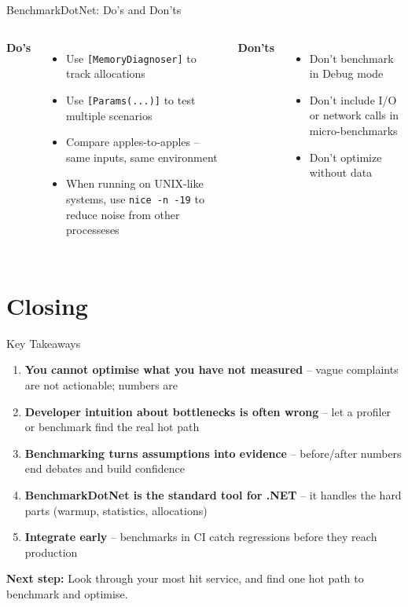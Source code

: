 \documentclass[aspectratio=1610, xcolor=table]{beamer}
\begin{document}
\begin{frame}{BenchmarkDotNet: Do's and Don'ts}
	\begin{columns}[T]
		\textbf{\textcolor{green!70!black}{Do's}}
		\begin{itemize}
			\item Use \texttt{[MemoryDiagnoser]} to track allocations
			\item Use \texttt{[Params(...)]} to test multiple scenarios
			\item Compare apples-to-apples -- same inputs, same environment
			\item When running on UNIX-like systems, use \texttt{nice -n -19} to reduce noise from other processeses
		\end{itemize}

		\textbf{\textcolor{red!70!black}{Don'ts}}
		\begin{itemize}
			\item Don't benchmark in Debug mode
			\item Don't include I/O or network calls in micro-benchmarks
			\item Don't optimize without data
		\end{itemize}
	\end{columns}
\end{frame}


\section{Closing}

\begin{frame}{Key Takeaways}
	\begin{enumerate}
		\item \textbf{You cannot optimise what you have not measured} --
		      vague complaints are not actionable; numbers are

		\item \textbf{Developer intuition about bottlenecks is often wrong} --
		      let a profiler or benchmark find the real hot path

		\item \textbf{Benchmarking turns assumptions into evidence} --
		      before/after numbers end debates and build confidence

		\item \textbf{BenchmarkDotNet is the standard tool for .NET} --
		      it handles the hard parts (warmup, statistics, allocations)

		\item \textbf{Integrate early} --
		      benchmarks in CI catch regressions before they reach production
	\end{enumerate}

	\vspace{1em}
	{\large \textcolor{PrimaryAccent}{\textbf{Next step:}}}
	Look through your most hit service, and find one hot path to benchmark and optimise.
\end{frame}
\end{document}

